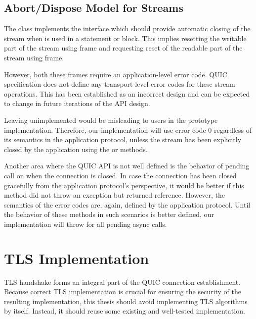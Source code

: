 \subsection{Abort/Dispose Model for Streams}

The \QuicStream{} class implements the  interface which should provide
automatic closing of the stream when \QuicStream{} is used in a  statement or
 block. This implies resetting the writable part of the stream using \RESETSTREAM{}
frame and requesting reset of the readable part of the stream using \STOPSENDING{} frame.

However, both these frames require an application-level error code. QUIC specification does not
define any transport-level error codes for these stream operations. This has been established as an
incorrect design and can be expected to change in future iterations of the API design.

Leaving  unimplemented would be misleading to users in the prototype
implementation. Therefore, our implementation will use error code 0 regardless of its semantics in
the application protocol, unless the stream has been explicitly closed by the application using the
 or  methods.

Another area where the QUIC API is not well defined is the behavior of pending 
call on \QuicConnection{} when the connection is closed. In case the connection has been closed
gracefully from the application protocol's perspective, it would be better if this method did not
throw an exception but returned  reference. However, the semantics of the error codes
are, again, defined by the application protocol. Until the behavior of these methods in such
scenarios is better defined, our implementation will throw
 for all pending async calls.

\section{TLS Implementation}

TLS handshake forms an integral part of the QUIC connection establishment. Because correct TLS
implementation is crucial for ensuring the security of the resulting implementation, this thesis
should avoid implementing TLS algorithms by itself. Instead, it should reuse some existing and
well-tested implementation.

